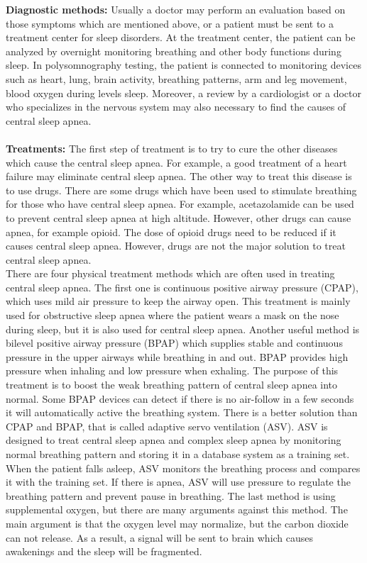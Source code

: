    \textbf{Diagnostic methods:} Usually a doctor may perform an evaluation based on those symptoms which are mentioned above, or a patient must be sent to a treatment center for sleep disorders. At the treatment center, the patient can be analyzed by overnight monitoring breathing and other body functions during sleep. In polysomnography testing, the patient is connected to monitoring devices such as heart, lung, brain activity, breathing patterns, arm and leg movement, blood oxygen during levels sleep. Moreover, a review by a cardiologist or a doctor who specializes in the nervous system may also necessary to find the causes of central sleep apnea.\\\\
    \textbf{Treatments:} The first step of treatment is to try to cure the other diseases which cause the central sleep apnea. For example, a good treatment of a heart failure may eliminate central sleep apnea. The other way to treat this disease is to use drugs. There are some drugs which have been used to stimulate breathing for those who have central sleep apnea. For example, acetazolamide can be used to prevent central sleep apnea at high altitude. However, other drugs can cause apnea, for example opioid. The dose of opioid drugs need to be reduced if it causes central sleep apnea. However, drugs are not the major solution to treat central sleep apnea. \\There are four physical treatment methods which are often used in treating central sleep apnea. The first one is continuous positive airway pressure (CPAP), which uses mild air pressure to keep the airway open. This treatment is mainly used for obstructive sleep apnea where the patient wears a mask on the nose during sleep, but it is also used for central sleep apnea. Another useful method is bilevel positive airway pressure (BPAP) which supplies stable and continuous pressure in the upper airways while breathing in and out. BPAP provides high pressure when inhaling and low pressure when exhaling. The purpose of this treatment is to boost the weak breathing pattern of central sleep apnea into normal. Some BPAP devices can detect if there is no air-follow in a few seconds it will automatically active the breathing system. There is a better solution than CPAP and BPAP, that is called adaptive servo ventilation (ASV). ASV is designed to treat central sleep apnea and complex sleep apnea by monitoring normal breathing pattern and storing it in a database system as a training set. When the patient falls asleep, ASV monitors the breathing process and compares it with the training set. If there is apnea, ASV will use pressure to regulate the breathing pattern and prevent pause in breathing. The last method is using supplemental oxygen, but there are many arguments against this method. The main argument is that the oxygen level may normalize, but the carbon dioxide can not release. As a result, a signal will be sent to brain which causes awakenings and the sleep will be fragmented. 
